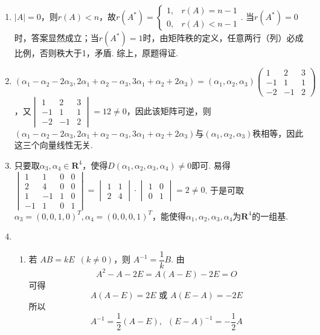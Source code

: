 \begin{enumerate}
\item $|A|=0$，则$r(A)<n$，故$r(A^*)=\begin{cases}
            1, & r(A)=n-1 \\
            0, & r(A)<n-1
        \end{cases}$. 当$r(A^*)=0$时，答案显然成立；当$r(A^*)=1$时，由矩阵秩的定义，任意两行（列）必成比例，否则秩大于1，矛盾. 综上，原题得证.

\item $(\alpha_1-\alpha_2-2\alpha_3,2\alpha_1+\alpha_2-\alpha_3,3\alpha_1+\alpha_2+2\alpha_3)=(\alpha_1,\alpha_2,\alpha_3)\begin{pmatrix}
            1 & 2 & 3 \\ -1 & 1 & 1 \\ -2 & -1 & 2
        \end{pmatrix}$，又$\begin{vmatrix}
            1 & 2 & 3 \\ -1 & 1 & 1 \\ -2 & -1 & 2
        \end{vmatrix}=12\neq 0$，因此该矩阵可逆，则$(\alpha_1-\alpha_2-2\alpha_3,2\alpha_1+\alpha_2-\alpha_3,3\alpha_1+\alpha_2+2\alpha_3)$与$(\alpha_1,\alpha_2,\alpha_3)$秩相等，因此这三个向量线性无关.

\item 只要取$\alpha_3,\alpha_4 \in \mathbf{R}^4$，使得$D(\alpha_1,\alpha_2,\alpha_3,\alpha_4) \neq 0$即可. 易得$\begin{vmatrix}
            1  & 1  & 0 & 0 \\
            2  & 4  & 0 & 0 \\
            1  & -1 & 1 & 0 \\
            -1 & 1  & 0 & 1
        \end{vmatrix}=\begin{vmatrix}
            1 & 1 \\
            2 & 4
        \end{vmatrix} \cdot \begin{vmatrix}
            1 & 0 \\
            0 & 1
        \end{vmatrix}=2 \neq 0$. 于是可取$\alpha_3=(0,0,1,0)^T,\alpha_4=(0,0,0,1)^T$，能使得${\alpha_1,\alpha_2,\alpha_3,\alpha_4}$为$\mathbf{R}^4$的一组基.

    \item \begin{enumerate}
              \item 若 $ AB = kE \enspace(k \neq 0) $，则 $ A^{-1} = \dfrac{1}{k} B $. 由
                    \[ A^2 - A - 2E = A(A - E) - 2E = O \]
                    可得
                    \[ A(A - E) = 2E \text{~或~} A(E - A) = -2E \]
                    所以
                    \[ A^{-1} = \frac{1}{2}(A-E),\enspace (E - A)^{-1} = -\frac{1}{2}A \]


\end{enumerate}
\end{enumerate}

